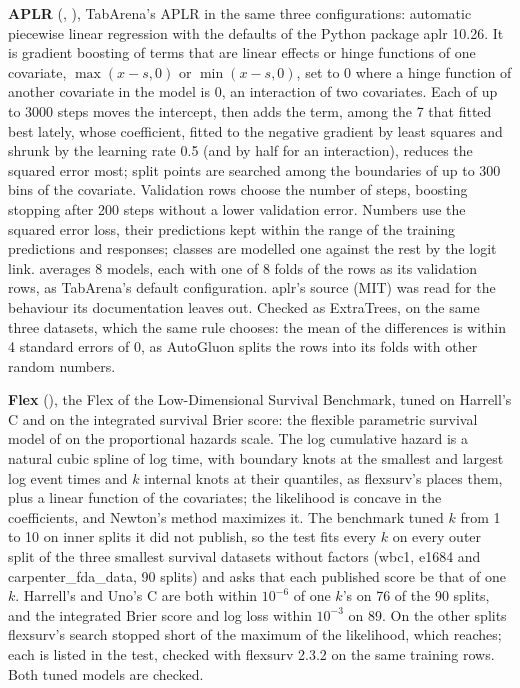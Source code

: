 \textbf{APLR} (, ), TabArena's APLR in the same three configurations: automatic piecewise
linear regression  with the defaults of the Python package aplr 10.26.
It is gradient boosting of terms that are linear effects or hinge functions of one covariate, $\max(x-s,0)$ or
$\min(x-s,0)$, set to 0 where a hinge function of another covariate in the model is 0, an interaction of two
covariates. Each of up to 3000 steps moves the intercept, then adds the term, among the 7 that fitted best lately,
whose coefficient, fitted to the negative gradient by least squares and shrunk by the learning rate 0.5 (and by half for
an interaction), reduces the squared error most; split points are searched among the boundaries of up to 300 bins of
the covariate. Validation rows choose the number of steps, boosting stopping after 200 steps without a lower validation
error. Numbers use the squared error loss, their predictions kept within the range of the training predictions and
responses; classes are modelled one against the rest by the logit link.  averages 8 models, each with
one of 8 folds of the rows as its validation rows, as TabArena's default configuration. aplr's source (MIT) was read
for the behaviour its documentation leaves out. Checked as ExtraTrees, on the same three datasets, which the same rule
chooses: the mean of the differences is within 4 standard errors of 0, as AutoGluon splits the rows into its folds
with other random numbers.

\textbf{Flex} (), the Flex of the Low-Dimensional Survival Benchmark, tuned on Harrell's C and on
the integrated survival Brier score: the flexible parametric survival model of
 on the proportional hazards scale. The log cumulative hazard is a natural
cubic spline of log time, with boundary knots at the smallest and largest log event times and $k$ internal knots at
their quantiles, as flexsurv's  places them, plus a linear function of the covariates; the
likelihood is concave in the coefficients, and Newton's method maximizes it. The benchmark tuned $k$ from 1 to 10 on
inner splits it did not publish, so the test fits every $k$ on every outer split of the three smallest survival
datasets without factors (wbc1, e1684 and carpenter\_fda\_data, 90 splits) and asks that each published score be that
of one $k$. Harrell's and Uno's C are both within $10^{-6}$ of one $k$'s on 76 of the 90 splits, and the integrated
Brier score and log loss within $10^{-3}$ on 89. On the other splits flexsurv's search stopped short of the maximum of
the likelihood, which  reaches; each is listed in the test, checked with flexsurv 2.3.2 on the
same training rows. Both tuned models are checked.

